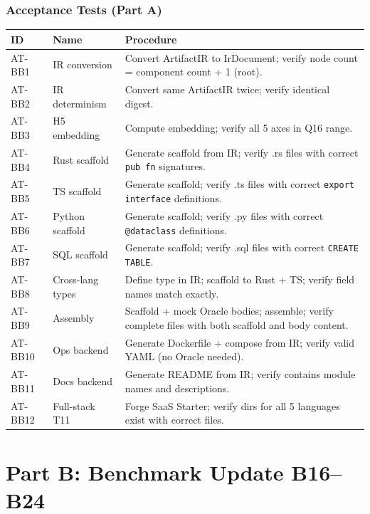 \documentclass[11pt,a4paper,twoside]{article}
\theoremstyle{definition}
\theoremstyle{plain}
\theoremstyle{remark}
\begin{document}
\section{Acceptance Tests (Part A)}\label{sec:testacc}

\begin{longtable}{l l p{5.5cm}}
\toprule
\textbf{ID} & \textbf{Name} & \textbf{Procedure} \\
\midrule
\endfirsthead \midrule \endhead \bottomrule \endfoot
AT-BB1 & IR conversion & Convert ArtifactIR to IrDocument; verify
  node count = component count + 1 (root). \\
AT-BB2 & IR determinism & Convert same ArtifactIR twice; verify
  identical digest. \\
AT-BB3 & H5 embedding & Compute embedding; verify all 5 axes in
  Q16 range. \\
AT-BB4 & Rust scaffold & Generate scaffold from IR; verify
  .rs files with correct \texttt{pub fn} signatures. \\
AT-BB5 & TS scaffold & Generate scaffold; verify .ts files with
  correct \texttt{export interface} definitions. \\
AT-BB6 & Python scaffold & Generate scaffold; verify .py files
  with correct \texttt{@dataclass} definitions. \\
AT-BB7 & SQL scaffold & Generate scaffold; verify .sql files
  with correct \texttt{CREATE TABLE}. \\
AT-BB8 & Cross-lang types & Define type in IR; scaffold to Rust +
  TS; verify field names match exactly. \\
AT-BB9 & Assembly & Scaffold + mock Oracle bodies; assemble;
  verify complete files with both scaffold and body content. \\
AT-BB10 & Ops backend & Generate Dockerfile + compose from IR;
  verify valid YAML (no Oracle needed). \\
AT-BB11 & Docs backend & Generate README from IR; verify
  contains module names and descriptions. \\
AT-BB12 & Full-stack T11 & Forge SaaS Starter; verify dirs for
  all 5 languages exist with correct files. \\
\end{longtable}


\part{Part B: Benchmark Update B16--B24}\label{part:bench}
\end{document}
